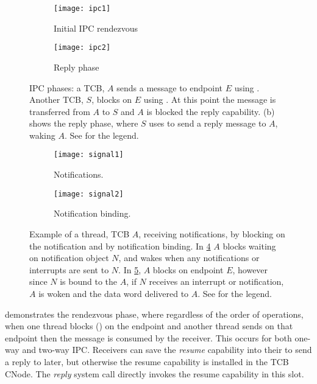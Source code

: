 \begin{figure}
    \centering
    \begin{subfigure}[h]{0.48\textwidth}
        \centering
        \texttt{[image: ipc1]}
        \caption{Initial IPC rendezvous}
        \label{f:ipc1}
    \end{subfigure}%
    \begin{subfigure}[h]{0.48\textwidth}
        \centering
        \texttt{[image: ipc2]}
        \caption{Reply phase}
        \label{f:ipc2}
    \end{subfigure}
    \caption{IPC phases: a TCB, $A$ sends a message to endpoint $E$ using \call. Another
        TCB, $S$, blocks on $E$ using \recv. At this point the message is transferred from 
        $A$ to $S$ and $A$ is blocked the reply capability. (b) shows the
    reply phase, where $S$ uses \reply to send a reply message to $A$, waking $A$. See  for the legend.}
    \label{f:ipc}
\end{figure}

\begin{figure}
    \centering
    \begin{subfigure}[h]{0.48\textwidth}
        \centering
        \texttt{[image: signal1]}
        \caption{Notifications.} 
        \label{f:signal1}
    \end{subfigure}%
    \begin{subfigure}[h]{0.48\textwidth}
        \centering
        \texttt{[image: signal2]}
        \caption{Notification binding.}
        \label{f:signal2}
    \end{subfigure}
    \caption{Example of a thread, TCB $A$, receiving notifications, by blocking on the notification and by
        notification binding. In \cref{f:signal1} $A$ blocks waiting on notification
        object $N$, and wakes when any notifications or interrupts are sent to $N$. In
        \cref{f:signal2}, $A$ blocks on endpoint $E$, however since
        $N$ is bound to the $A$, if $N$ receives an interrupt or notification,
        $A$ is woken and the data word delivered to $A$.
        See  for the legend.}
    \label{f:signal}
\end{figure}

 demonstrates the rendezvous phase, where regardless of the order of operations, 
when one thread blocks (\recv) on the endpoint and another thread sends on that endpoint
then the message is consumed by the receiver. This occurs for both one-way and two-way \gls{IPC}.
Receivers can save
the \emph{resume} capability into their \cspace to send a reply to later, but otherwise the resume capability is
installed in the \gls{TCB} CNode. The \emph{reply} system call directly invokes the resume
capability in this slot. 

